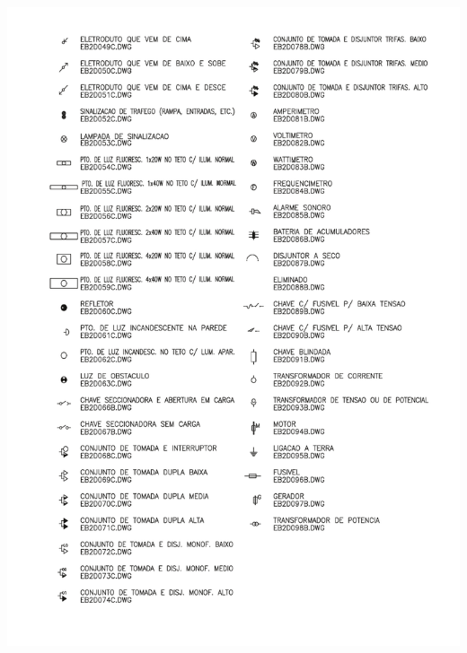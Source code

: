 \newpage
{	\centering
	\includegraphics[width=\textwidth]{Figures/5. Symbology/simbologia2b.pdf}
	\label{fig: symbology 2b}
}